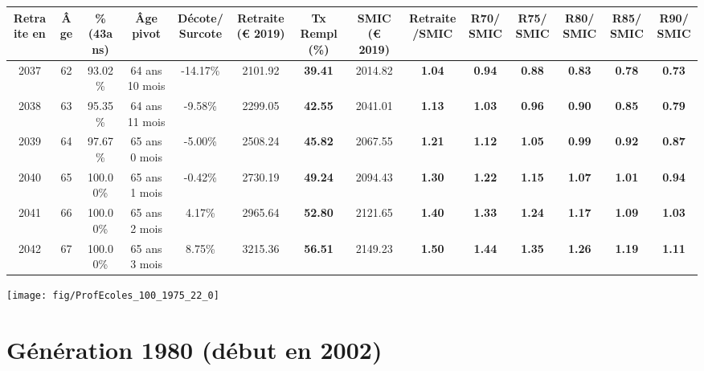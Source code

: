 \begin{adjustbox}{max width=\textwidth} 
\begin{tabular}[htb]{|c|c||c|c|c||c|c||c|c||c|c|c|c|c|} 
\hline 
 Retraite en &  Âge &  \%(43ans) &  Âge pivot &  Décote/Surcote &  Retraite (\euro{} 2019) &  Tx Rempl(\%) &  SMIC (\euro{} 2019) &  Retraite/SMIC &  R70/SMIC &  R75/SMIC &  R80/SMIC &  R85/SMIC &  R90/SMIC \\ 
\hline \hline 
 2037 &  62 &  93.02\% &  64 ans 10 mois &  -14.17\% &  2101.92 &  {\bf 39.41} &  2014.82 &  {\bf 1.04} &  {\bf {\color{red} 0.94}} &  {\bf {\color{red} 0.88}} &  {\bf {\color{red} 0.83}} &  {\bf {\color{red} 0.78}} &  {\bf {\color{red} 0.73}} \\ 
\hline 
 2038 &  63 &  95.35\% &  64 ans 11 mois &  -9.58\% &  2299.05 &  {\bf 42.55} &  2041.01 &  {\bf 1.13} &  {\bf 1.03} &  {\bf {\color{red} 0.96}} &  {\bf {\color{red} 0.90}} &  {\bf {\color{red} 0.85}} &  {\bf {\color{red} 0.79}} \\ 
\hline 
 2039 &  64 &  97.67\% &  65 ans 0 mois &  -5.00\% &  2508.24 &  {\bf 45.82} &  2067.55 &  {\bf 1.21} &  {\bf 1.12} &  {\bf 1.05} &  {\bf {\color{red} 0.99}} &  {\bf {\color{red} 0.92}} &  {\bf {\color{red} 0.87}} \\ 
\hline 
 2040 &  65 &  100.00\% &  65 ans 1 mois &  -0.42\% &  2730.19 &  {\bf 49.24} &  2094.43 &  {\bf 1.30} &  {\bf 1.22} &  {\bf 1.15} &  {\bf 1.07} &  {\bf 1.01} &  {\bf {\color{red} 0.94}} \\ 
\hline 
 2041 &  66 &  100.00\% &  65 ans 2 mois &  4.17\% &  2965.64 &  {\bf 52.80} &  2121.65 &  {\bf 1.40} &  {\bf 1.33} &  {\bf 1.24} &  {\bf 1.17} &  {\bf 1.09} &  {\bf 1.03} \\ 
\hline 
 2042 &  67 &  100.00\% &  65 ans 3 mois &  8.75\% &  3215.36 &  {\bf 56.51} &  2149.23 &  {\bf 1.50} &  {\bf 1.44} &  {\bf 1.35} &  {\bf 1.26} &  {\bf 1.19} &  {\bf 1.11} \\ 
\hline 
\hline 
\end{tabular} 
\end{adjustbox} 
 
 \vspace{0.1cm} 

 {\hspace{-2.2cm}\texttt{[image: fig/ProfEcoles\_100\_1975\_22\_0]}} 

\newpage 
 
\section{Génération 1980 (début en 2002)\label{ProfEcoles_100_1980_22_0}} 
 
